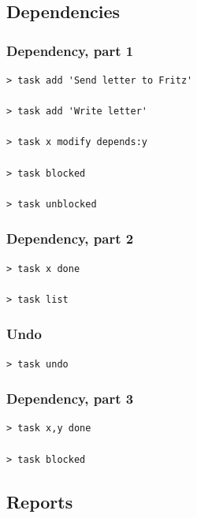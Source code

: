 \documentclass[t,handout,aspectratio=169]{beamer}
\begin{document}
\subsection{Dependencies}

\begin{frame}[fragile]\frametitle{Dependency, part 1}
    \vfill
    \begin{lstlisting}
> task add 'Send letter to Fritz'

> task add 'Write letter'

> task x modify depends:y

> task blocked

> task unblocked\end{lstlisting}
\end{frame}

\begin{frame}[fragile]\frametitle{Dependency, part 2}
    \vfill
    \begin{lstlisting}
> task x done

> task list\end{lstlisting}
\end{frame}

\begin{frame}[fragile]\frametitle{Undo}
    \vfill
    \begin{lstlisting}
> task undo\end{lstlisting}
\end{frame}

\begin{frame}[fragile]\frametitle{Dependency, part 3}
    \vfill
    \begin{lstlisting}
> task x,y done

> task blocked\end{lstlisting}
\end{frame}

\subsection{Reports}
\end{document}
